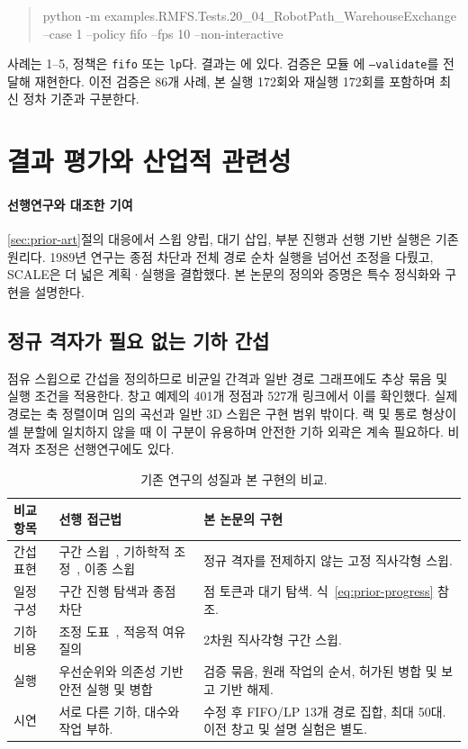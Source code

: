 \documentclass[11pt,a4paper]{article}
\theoremstyle{remark}
\begin{document}
\begin{quote}\small\ttfamily
python -m examples.RMFS.Tests.20\_04\_RobotPath\_WarehouseExchange\\
\hspace*{1em}--case 1 --policy fifo --fps 10 --non-interactive
\end{quote}
사례는 1--5, 정책은 \texttt{fifo} 또는 \texttt{lp}다. 결과는 에 있다. 검증은 모듈 에 \texttt{--validate}를 전달해 재현한다. 이전 검증은 86개 사례, 본 실행 172회와 재실행 172회를 포함하며 최신 정차 기준과 구분한다.

\section{결과 평가와 산업적 관련성}
\label{sec:contributions}
\paragraph{선행연구와 대조한 기여}
\ref{sec:prior-art}절의 대응에서 스윕 양립, 대기 삽입, 부분 진행과 선행 기반 실행은 기존 원리다. 1989년 연구는 종점 차단과 전체 경로 순차 실행을 넘어선 조정을 다뤘고, SCALE은 더 넓은 계획·실행을 결합했다. 본 논문의 정의와 증명은 특수 정식화와 구현을 설명한다.

\subsection{정규 격자가 필요 없는 기하 간섭}
점유 스윕으로 간섭을 정의하므로 비균일 간격과 일반 경로 그래프에도 추상 묶음 및 실행 조건을 적용한다. 창고 예제의 401개 정점과 527개 링크에서 이를 확인했다. 실제 경로는 축 정렬이며 임의 곡선과 일반 3D 스윕은 구현 범위 밖이다. 랙 및 통로 형상이 셀 분할에 일치하지 않을 때 이 구분이 유용하며 안전한 기하 외곽은 계속 필요하다. 비격자 조정은 선행연구에도 있다.
\begin{table}[htbp]
\centering\small
\caption{기존 연구의 성질과 본 구현의 비교.}
\label{tab:literature-comparison}
\begin{tabular}{p{.22\linewidth}p{.34\linewidth}p{.35\linewidth}}
\toprule
비교 항목 & 선행 접근법 & 본 논문의 구현\\\midrule
간섭 표현 & 구간 스윕~\cite{odonnell1989}, 기하학적 조정~\cite{leroy1999}, 이종 스윕~\cite{scale2026} & 정규 격자를 전제하지 않는 고정 직사각형 스윕.\\[4pt]
일정 구성 & 구간 진행 탐색과 종점 차단~\cite{odonnell1989} & 점 토큰과 대기 탐색. 식~\eqref{eq:prior-progress} 참조.\\[4pt]
기하 비용 & 조정 도표~\cite{leroy1999}, 적응적 여유 질의~\cite{ablad2021} & 2차원 직사각형 구간 스윕.\\[4pt]
실행 & 우선순위와 의존성 기반 안전 실행 및 병합~\cite{gregoire2015,cap2016,hoenig2019,berndt2024,scale2026} & 검증 묶음, 원래 작업의 순서, 허가된 병합 및 보고 기반 해제.\\[4pt]
시연 & 서로 다른 기하, 대수와 작업 부하. & 수정 후 FIFO/LP 13개 경로 집합, 최대 50대. 이전 창고 및 설명 실험은 별도.\\
\bottomrule
\end{tabular}
\end{table}
\end{document}
